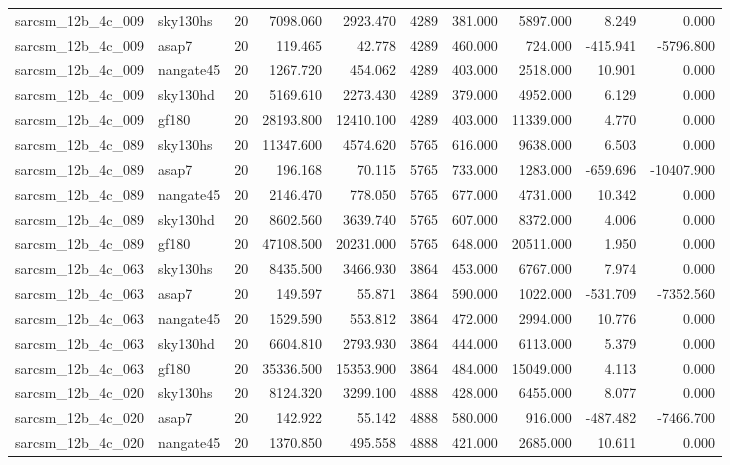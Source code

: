 \begin{tabular}{llrrrrrrrr}
sarcsm\_12b\_4c\_009 & sky130hs & 20 & 7098.060 & 2923.470 & 4289 & 381.000 & 5897.000 & 8.249 & 0.000 \\
sarcsm\_12b\_4c\_009 & asap7 & 20 & 119.465 & 42.778 & 4289 & 460.000 & 724.000 & -415.941 & -5796.800 \\
sarcsm\_12b\_4c\_009 & nangate45 & 20 & 1267.720 & 454.062 & 4289 & 403.000 & 2518.000 & 10.901 & 0.000 \\
sarcsm\_12b\_4c\_009 & sky130hd & 20 & 5169.610 & 2273.430 & 4289 & 379.000 & 4952.000 & 6.129 & 0.000 \\
sarcsm\_12b\_4c\_009 & gf180 & 20 & 28193.800 & 12410.100 & 4289 & 403.000 & 11339.000 & 4.770 & 0.000 \\
sarcsm\_12b\_4c\_089 & sky130hs & 20 & 11347.600 & 4574.620 & 5765 & 616.000 & 9638.000 & 6.503 & 0.000 \\
sarcsm\_12b\_4c\_089 & asap7 & 20 & 196.168 & 70.115 & 5765 & 733.000 & 1283.000 & -659.696 & -10407.900 \\
sarcsm\_12b\_4c\_089 & nangate45 & 20 & 2146.470 & 778.050 & 5765 & 677.000 & 4731.000 & 10.342 & 0.000 \\
sarcsm\_12b\_4c\_089 & sky130hd & 20 & 8602.560 & 3639.740 & 5765 & 607.000 & 8372.000 & 4.006 & 0.000 \\
sarcsm\_12b\_4c\_089 & gf180 & 20 & 47108.500 & 20231.000 & 5765 & 648.000 & 20511.000 & 1.950 & 0.000 \\
sarcsm\_12b\_4c\_063 & sky130hs & 20 & 8435.500 & 3466.930 & 3864 & 453.000 & 6767.000 & 7.974 & 0.000 \\
sarcsm\_12b\_4c\_063 & asap7 & 20 & 149.597 & 55.871 & 3864 & 590.000 & 1022.000 & -531.709 & -7352.560 \\
sarcsm\_12b\_4c\_063 & nangate45 & 20 & 1529.590 & 553.812 & 3864 & 472.000 & 2994.000 & 10.776 & 0.000 \\
sarcsm\_12b\_4c\_063 & sky130hd & 20 & 6604.810 & 2793.930 & 3864 & 444.000 & 6113.000 & 5.379 & 0.000 \\
sarcsm\_12b\_4c\_063 & gf180 & 20 & 35336.500 & 15353.900 & 3864 & 484.000 & 15049.000 & 4.113 & 0.000 \\
sarcsm\_12b\_4c\_020 & sky130hs & 20 & 8124.320 & 3299.100 & 4888 & 428.000 & 6455.000 & 8.077 & 0.000 \\
sarcsm\_12b\_4c\_020 & asap7 & 20 & 142.922 & 55.142 & 4888 & 580.000 & 916.000 & -487.482 & -7466.700 \\
sarcsm\_12b\_4c\_020 & nangate45 & 20 & 1370.850 & 495.558 & 4888 & 421.000 & 2685.000 & 10.611 & 0.000 \\

\end{tabular}

